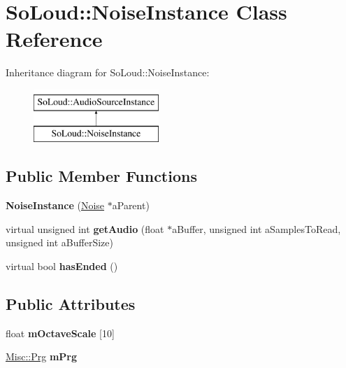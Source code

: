\hypertarget{class_so_loud_1_1_noise_instance}{}\section{So\+Loud\+::Noise\+Instance Class Reference}
\label{class_so_loud_1_1_noise_instance}
Inheritance diagram for So\+Loud\+::Noise\+Instance\+:\begin{figure}[H]
\begin{center}
\leavevmode
\includegraphics[height=2.000000cm]{class_so_loud_1_1_noise_instance}
\end{center}
\end{figure}
\subsection*{Public Member Functions}
\begin{DoxyCompactItemize}
\item 
\mbox{\label{class_so_loud_1_1_noise_instance_a90d7b96f60de80486560a406295202aa}} 
{\bfseries Noise\+Instance} (\mbox{\hyperlink{class_so_loud_1_1_noise}{Noise}} $\ast$a\+Parent)
\item 
\mbox{\label{class_so_loud_1_1_noise_instance_a5f4db684a02fc2ebd5e6cc94f4014f03}} 
virtual unsigned int {\bfseries get\+Audio} (float $\ast$a\+Buffer, unsigned int a\+Samples\+To\+Read, unsigned int a\+Buffer\+Size)
\item 
\mbox{\label{class_so_loud_1_1_noise_instance_a278812de5666ec60177cac2b6cb13f9a}} 
virtual bool {\bfseries has\+Ended} ()
\end{DoxyCompactItemize}
\subsection*{Public Attributes}
\begin{DoxyCompactItemize}
\item 
\mbox{\label{class_so_loud_1_1_noise_instance_adbe0940d0426416fa3071efc2a452cef}} 
float {\bfseries m\+Octave\+Scale} \mbox{[}10\mbox{]}
\item 
\mbox{\label{class_so_loud_1_1_noise_instance_aa03c8307dd4efab7e06c299051bc0a46}} 
\mbox{\hyperlink{class_so_loud_1_1_misc_1_1_prg}{Misc\+::\+Prg}} {\bfseries m\+Prg}
\end{DoxyCompactItemize}
